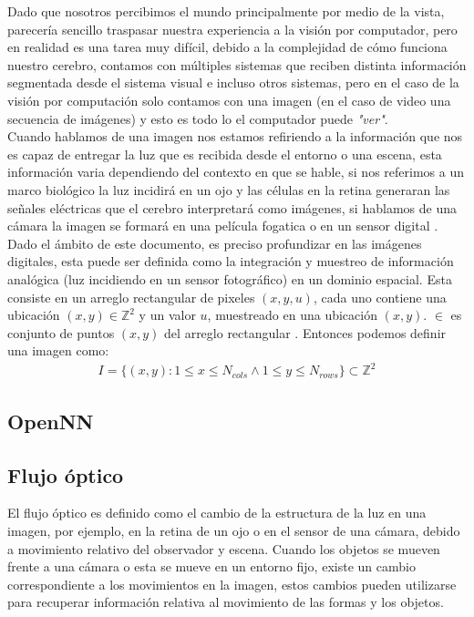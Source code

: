 \documentclass{iccmemoria}
\begin{document}
Dado que nosotros percibimos el mundo principalmente por medio de la vista, parecería sencillo traspasar nuestra experiencia a la visión por computador, pero en realidad es una tarea muy difícil, debido a la complejidad de cómo funciona nuestro cerebro, contamos con múltiples sistemas que reciben distinta información segmentada desde el sistema visual e incluso otros sistemas, pero en el caso de la visión por computación solo contamos con una imagen (en el caso de video una secuencia de imágenes) y esto es todo lo el computador puede \emph{"ver"}.\\

Cuando hablamos de una imagen nos estamos refiriendo a la información que nos es capaz de entregar la luz que es recibida desde el entorno o una escena, esta información varia dependiendo del contexto en que se hable, si nos referimos a un marco biológico la luz incidirá en un ojo y las células en la retina generaran las señales eléctricas que el cerebro interpretará como imágenes, si hablamos de una cámara la imagen se formará en una película fogatica o en un sensor digital \cite{bradski2008learning}.\\

Dado el ámbito de este documento, es preciso profundizar en las imágenes digitales, esta puede ser definida como la integración y muestreo de información analógica (luz incidiendo en un sensor fotográfico) en un dominio espacial. Esta consiste en un arreglo rectangular de pixeles $(x, y, u)$, cada uno contiene una ubicación $(x, y) \in \mathbb{Z}^2 $ y un valor $u$, muestreado en una ubicación $(x, y)$. $\in$ es conjunto de puntos $(x, y)$ del arreglo rectangular \cite{klette2014concise}. Entonces podemos definir una imagen como:
\begin{equation}
	\begin{split}
	I = \lbrace (x, y) : 1 \leq  x \leq N_{cols} \wedge 1 \leq y \leq N_{rows} \rbrace \subset \mathbb{Z}^2
	\end{split}
\end{equation}

\subsection{OpenNN}

\subsection{Flujo óptico}\label{flujo_optico}

El flujo óptico es definido como el cambio de la estructura de la luz en una imagen, por ejemplo, en la retina de un ojo o en el sensor de una cámara, debido a movimiento relativo del observador y escena. Cuando los objetos se mueven frente a una cámara o esta se mueve en un entorno fijo, existe un cambio correspondiente a los movimientos en la imagen, estos cambios pueden utilizarse para recuperar información relativa al movimiento de las formas y los objetos.\\
\end{document}
